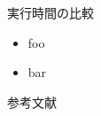 \documentclass[dvipdfmx]{beamer}
\theoremstyle{definition}
\begin{document}
\appendix
\begin{frame}{実行時間の比較}
  \begin{itemize}
  \item foo
  \item bar
  \end{itemize}
\end{frame}

\begin{frame}[allowframebreaks]{参考文献}
  
  
\end{frame}
\end{document}

